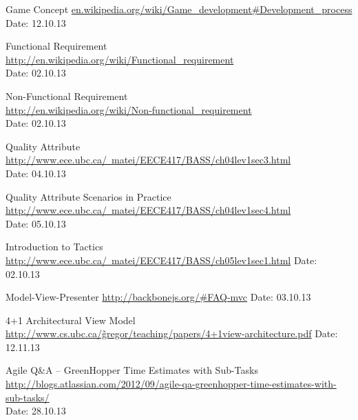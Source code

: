 \begin{thebibliography}{99}
	Game Concept\newline
	\href {en.wikipedia.org/wiki/Game_development#Development_process}{en.wikipedia.org/wiki/Game\_development\#Development\_process}\newline
	Date: 12.10.13

	Functional Requirement \\
	\href{http://en.wikipedia.org/wiki/Functional_requirement}{http://en.wikipedia.org/wiki/Functional\_requirement} \\
	Date: 02.10.13

	Non-Functional Requirement \\
	\href{http://en.wikipedia.org/wiki/Non-functional_requirement}{http://en.wikipedia.org/wiki/Non-functional\_requirement} \\
	Date: 02.10.13

	Quality Attribute \\
	\href{http://www.ece.ubc.ca/~matei/EECE417/BASS/ch04lev1sec3.html}{http://www.ece.ubc.ca/~matei/EECE417/BASS/ch04lev1sec3.html} \\
	Date: 04.10.13

	Quality Attribute Scenarios in Practice \\ 
	\href{http://www.ece.ubc.ca/~matei/EECE417/BASS/ch04lev1sec4.html}{http://www.ece.ubc.ca/~matei/EECE417/BASS/ch04lev1sec4.html} \\
	Date: 05.10.13

	Introduction to Tactics \newline
	\href {http://www.ece.ubc.ca/~matei/EECE417/BASS/ch05lev1sec1.html}{http://www.ece.ubc.ca/~matei/EECE417/BASS/ch05lev1sec1.html} \newline
	Date: 02.10.13

	Model-View-Presenter\newline
	\href {http://backbonejs.org/\#FAQ-mvc}{http://backbonejs.org/\#FAQ-mvc}\newline
	Date: 03.10.13

	4+1 Architectural View Model
	\href{http://www.cs.ubc.ca/~gregor/teaching/papers/4+1view-architecture.pdf}{http://www.cs.ubc.ca/\~gregor/teaching/papers/4+1view-architecture.pdf}
	Date: 12.11.13

	Agile Q\&A – GreenHopper Time Estimates with Sub-Tasks \\
	\href{http://blogs.atlassian.com/2012/09/agile-qa-greenhopper-time-estimates-with-sub-tasks/}{http://blogs.atlassian.com/2012/09/agile-qa-greenhopper-time-estimates-with-sub-tasks/} \\
	Date: 28.10.13


\end{thebibliography}
